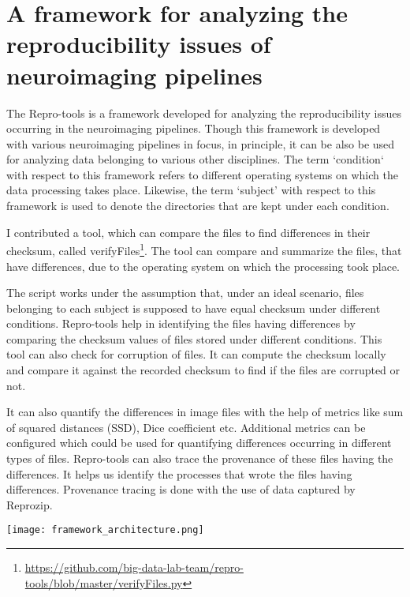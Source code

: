 \chapter{A framework for analyzing the reproducibility issues of neuroimaging pipelines}
The Repro-tools  is a framework developed for analyzing the reproducibility issues occurring in the neuroimaging pipelines. Though this framework is developed with various neuroimaging pipelines in focus, in principle, it can be also be used for analyzing data belonging to various other disciplines. The term `condition` with respect to this framework refers to different operating systems on which the data processing takes place. Likewise, the term `subject' with respect to this framework is used to denote the directories that are kept under each condition. 

I contributed a tool, which can compare the files to find differences in their checksum, called verifyFiles\footnote{\url{https://github.com/big-data-lab-team/repro-tools/blob/master/verifyFiles.py}}. The tool can compare and summarize the files, that have differences, due to the operating system on which the processing took place.

The script works under the assumption that, under an ideal scenario, files belonging to each subject is supposed to have equal checksum under different conditions. Repro-tools help in identifying the files having differences by comparing the checksum values of files stored under different conditions. This tool can also check for corruption of files. It can compute the checksum locally and compare it against the recorded checksum to find if the files are corrupted or not.

It can also quantify the differences in image files with the help of metrics like sum of squared distances (SSD), Dice coefficient etc. Additional metrics can be configured which could be used for quantifying differences occurring in different types of files. Repro-tools can also trace the provenance of these files having the differences. It helps us identify the processes that wrote the files having differences. Provenance tracing is done with the use of data captured by Reprozip.


\begin{center}
\texttt{[image: framework\_architecture.png]}
\label{fig:framework_architecture}
\end{center}

